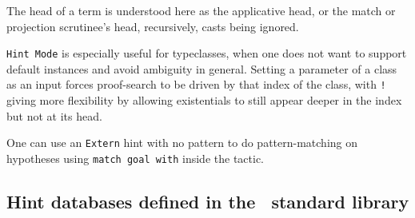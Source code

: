 \begin{coq_example*}
\begin{itemize}
The head of a term is understood here as the applicative head, or the
match or projection scrutinee's head, recursively, casts being ignored.

{\tt Hint Mode} is especially useful for typeclasses, when one does not
want to support default instances and avoid ambiguity in
general. Setting a parameter of a class as an input forces proof-search
to be driven by that index of the class, with {\tt !} giving more
flexibility by allowing existentials to still appear deeper in the index
but not at its head.

\end{itemize}

\Rem One can use an \texttt{Extern} hint with no pattern to do
pattern-matching on hypotheses using \texttt{match goal with} inside
the tactic.






\subsection{Hint databases defined in the \Coq\ standard library}


\end{coq_example*}
